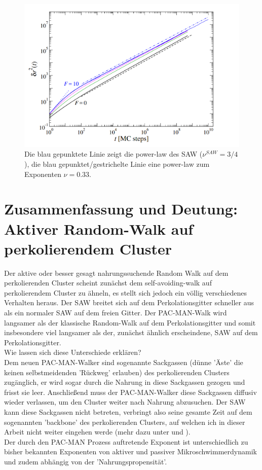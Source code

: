 \documentclass[a4paper, 12pt]{report}
\begin{document}
\begin{figure}[h!]
	\centering
	\includegraphics[scale=0.5]{food_thomas.png}
	\caption{Die blau gepunktete Linie zeigt die power-law des SAW ($\nu^{SAW}=3/4$), die blau gepunktet/gestrichelte Linie eine power-law zum Exponenten $\nu = 0.33$.\label{food_thomas}}
\end{figure}

\section{Zusammenfassung und Deutung: Aktiver Random-Walk auf perkolierendem Cluster}
Der aktive oder besser gesagt nahrungssuchende Random Walk auf dem perkolierenden Cluster scheint zunächst dem self-avoiding-walk auf perkolierendem Cluster zu ähneln, es stellt sich jedoch ein völlig verschiedenes Verhalten heraus. Der SAW breitet sich auf dem Perkolationsgitter schneller aus als ein normaler SAW auf dem freien Gitter. Der PAC-MAN-Walk wird langsamer als der klassische Random-Walk auf dem Perkolationsgitter und somit insbesondere viel langsamer als der, zunächst ähnlich erscheindene, SAW auf dem Perkolationsgitter.
\\
\noindent Wie lassen sich diese Unterschiede erklären?
\\
\noindent Dem neuen PAC-MAN-Walker sind sogenannte Sackgassen (dünne 'Äste' die keinen selbstmeidenden 'Rückweg' erlauben) des perkolierenden Clusters zugänglich, er wird sogar durch die Nahrung in diese Sackgassen gezogen und frisst sie leer. Anschließend muss der PAC-MAN-Walker diese Sackgassen diffusiv wieder verlassen, um den Cluster weiter nach Nahrung abzusuchen. Der SAW kann diese Sackgassen nicht betreten, verbringt also seine gesamte Zeit auf dem sogenannten 'backbone' des perkolierenden Clusters, auf welchen ich in dieser Arbeit nicht weiter eingehen werde (mehr dazu unter \cite{doi:10.1063/1.4999485} und \cite{PhysRevLett.101.125701}). 
\\
\noindent Der durch den PAC-MAN Prozess auftretende Exponent ist unterschiedlich zu bisher bekannten Exponenten von aktiver und passiver Mikroschwimmerdynamik und zudem abhängig von der 'Nahrungspropensität'.
\end{document}
